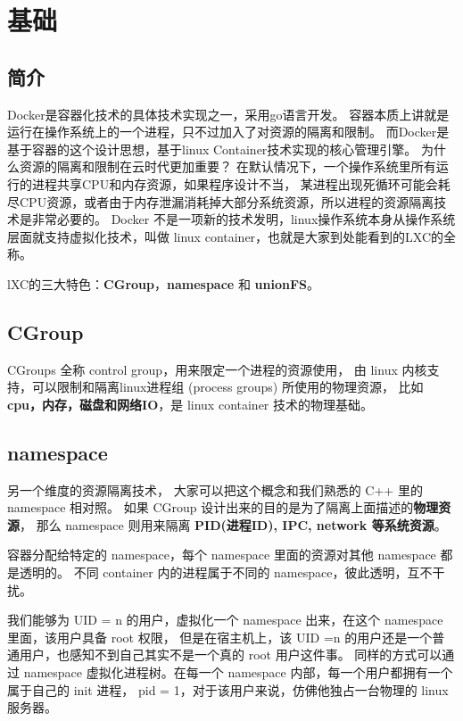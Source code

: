 \chapter{基础}
\newpage

\section{简介}

Docker是容器化技术的具体技术实现之一，采用go语言开发。
容器本质上讲就是运行在操作系统上的一个进程，只不过加入了对资源的隔离和限制。
而Docker是基于容器的这个设计思想，基于linux Container技术实现的核心管理引擎。
为什么资源的隔离和限制在云时代更加重要？
在默认情况下，一个操作系统里所有运行的进程共享CPU和内存资源，如果程序设计不当，
某进程出现死循环可能会耗尽CPU资源，或者由于内存泄漏消耗掉大部分系统资源，所以进程的资源隔离技术是非常必要的。
Docker 不是一项新的技术发明，linux操作系统本身从操作系统层面就支持虚拟化技术，叫做 linux container，也就是大家到处能看到的LXC的全称。

lXC的三大特色：\textbf{CGroup}，\textbf{namespace} 和 \textbf{unionFS}。

\section{CGroup}

CGroups 全称 control group，用来限定一个进程的资源使用，
由 linux 内核支持，可以限制和隔离linux进程组 (process groups) 所使用的物理资源，
比如\textbf{cpu，内存，磁盘和网络IO}，是 linux container 技术的物理基础。

\section{namespace}

另一个维度的资源隔离技术， 大家可以把这个概念和我们熟悉的 C++ 里的 namespace 相对照。
如果 CGroup 设计出来的目的是为了隔离上面描述的\textbf{物理资源}，
那么 namespace 则用来隔离 \textbf{ PID(进程ID), IPC, network 等系统资源}。

容器分配给特定的 namespace，每个 namespace 里面的资源对其他 namespace 都是透明的。
不同 container 内的进程属于不同的 namespace，彼此透明，互不干扰。

我们能够为 UID = n 的用户，虚拟化一个 namespace 出来，在这个 namespace 里面，该用户具备 root 权限，
但是在宿主机上，该 UID =n 的用户还是一个普通用户，也感知不到自己其实不是一个真的 root 用户这件事。
同样的方式可以通过 namespace 虚拟化进程树。在每一个 namespace 内部，每一个用户都拥有一个属于自己的 init 进程，
pid = 1，对于该用户来说，仿佛他独占一台物理的 linux 服务器。

